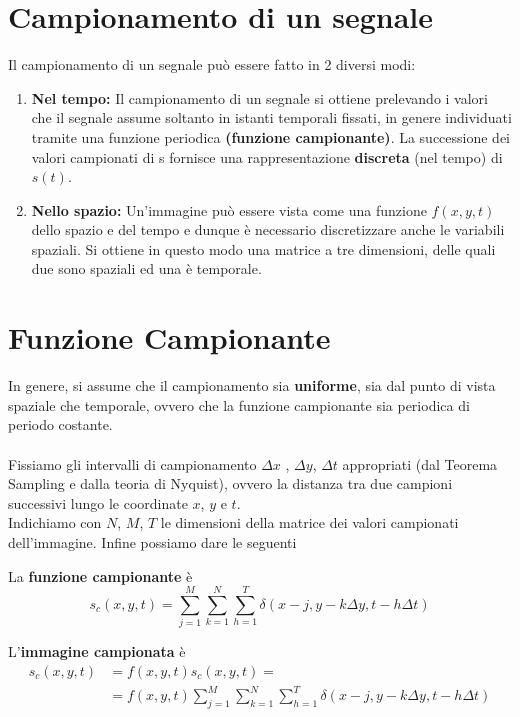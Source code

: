 \section{Campionamento di un segnale}
Il campionamento di un segnale può essere fatto in 2 diversi modi:
\begin{enumerate}
    \item \textbf{Nel tempo:} Il campionamento di un segnale si ottiene
          prelevando i valori che il segnale assume soltanto in istanti
          temporali fissati, in genere individuati tramite una funzione
          periodica \textbf{(funzione campionante)}. La successione dei valori
          campionati di s fornisce una rappresentazione \textbf{discreta} (nel
          tempo) di $s(t)$.
    \item \textbf{Nello spazio:} Un'immagine può essere vista come una funzione
          $f(x,y,t)$ dello spazio e del tempo e dunque è necessario
          discretizzare anche le variabili spaziali. Si ottiene in questo modo
          una matrice a tre dimensioni, delle quali due sono spaziali ed una è
          temporale.
\end{enumerate}
\section{Funzione Campionante}
In genere, si assume che il campionamento sia \textbf{uniforme}, sia dal punto
di vista spaziale che temporale, ovvero che la funzione campionante sia
periodica di periodo costante. \\\\Fissiamo gli intervalli di campionamento
$\Delta x$ , $\Delta y$, $\Delta t$ appropriati (dal Teorema Sampling e dalla
teoria di Nyquist), ovvero la distanza tra due campioni successivi lungo le
coordinate $x$, $y$ e $t$.\\Indichiamo con $N$, $M$, $T$ le dimensioni della
matrice dei valori campionati dell'immagine. Infine possiamo dare le seguenti

\begin{definition}
    La \textbf{funzione campionante} è
    $$
        s_c(x,y,t) = \sum_{j=1}^{M} \sum_{k=1}^{N}\sum_{h=1}^{T} \delta (x-j, y - k
        \Delta y, t - h  \Delta t )
    $$
\end{definition}

\begin{definition}
    L'\textbf{immagine campionata} è
    \begin{equation}
        \begin{aligned}
            s_c(x,y,t) & = f(x,y,t)s_c(x,y,t) =                                                                                \\
                       & = f(x,y,t) \sum_{j=1}^{M} \sum_{k=1}^{N}\sum_{h=1}^{T} \delta (x-j, y - k \Delta y, t - h  \Delta t )
        \end{aligned}
    \end{equation}
\end{definition}

